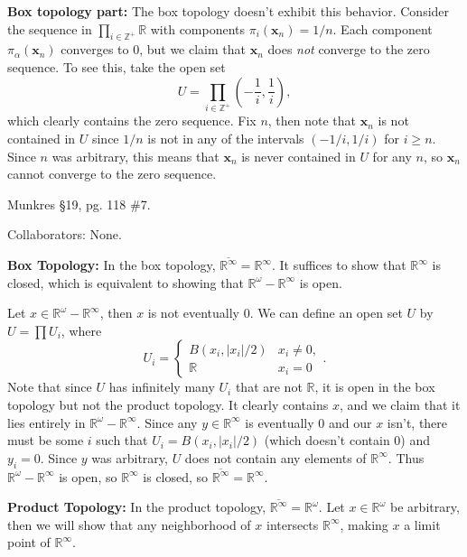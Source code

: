 \documentclass[10pt]{report}
\begin{document}
\textbf{Box topology part:} The box topology doesn't exhibit this behavior. Consider the sequence in $\prod_{i \in \mathbb{Z}^+}\mathbb{R}$ with components $\pi_{i}(\mathbf{x}_{n})=1/n$. Each component $\pi_{\alpha}(\mathbf{x}_{n})$ converges to 0, but we claim that $\mathbf{x}_{n}$ does \textit{not} converge to the zero sequence. To see this, take the open set
\[
	U = \prod_{i \in \mathbb{Z}^+}\left( -\frac{1}{i} ,\frac{1}{i}  \right),
\] which clearly contains the zero sequence. Fix $n$, then note that $\mathbf{x}_{n}$ is not contained in $U$ since $1/n$ is not in any of the intervals $(-1/i, 1/i)$ for $i \geq n$. Since $n$ was arbitrary, this means that $\mathbf{x}_{n}$ is never contained in $U$ for any $n$, so $\mathbf{x}_{n}$ cannot converge to the zero sequence.

\begin{exer}[]
Munkres \S 19, pg. 118 \#7.
\end{exer}
{\color{blue}Collaborators: None.}

\textbf{Box Topology:} In the box topology, $\overline{\mathbb{R}^{\infty}} =\mathbb{R}^{\infty}$. It suffices to show that $\mathbb{R}^{\infty}$ is closed, which is equivalent to showing that $\mathbb{R}^{\omega}-\mathbb{R}^{\infty}$ is open.

Let $x \in \mathbb{R}^{\omega}-\mathbb{R}^{\infty}$, then $x$ is not eventually 0. We can define an open set $U$ by $U = \prod U_i$, where
\[
U_i =
\begin{cases}
	B(x_i, |x_i|/2) & x_i \neq 0,\\
	\mathbb{R} & x_i=0
\end{cases}.
\] Note that since $U$ has infinitely many $U_i$ that are not $\mathbb{R}$, it is open in the box topology but not the product topology. It clearly contains $x$, and we claim that it lies entirely in $\mathbb{R}^{\omega}-\mathbb{R}^{\infty}$. Since any $y \in \mathbb{R}^{\infty}$ is eventually 0 and our $x$ isn't, there must be some $i$ such that $U_i=B(x_i, |x_i|/2)$ (which doesn't contain 0) and $y_i=0$. Since $y$ was arbitrary, $U$ does not contain any elements of $\mathbb{R}^{\infty}$. Thus $\mathbb{R}^{\omega}-\mathbb{R}^{\infty}$ is open, so $\mathbb{R}^{\infty}$ is closed, so $\overline{\mathbb{R}^{\infty}} =\mathbb{R}^{\infty}$.

\textbf{Product Topology:} In the product topology, $\overline{\mathbb{R}^{\infty}} =\mathbb{R}^{\omega}$. Let $x \in \mathbb{R}^{\omega}$ be arbitrary, then we will show that any neighborhood of $x$ intersects $\mathbb{R}^{\infty}$, making $x$ a limit point of $\mathbb{R}^{\infty}$.
\end{document}
